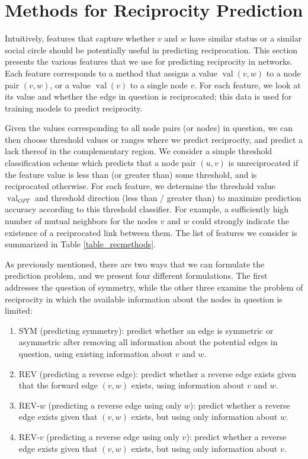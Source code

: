 \documentclass[conference]{IEEEtran}
\begin{document}
\section{Methods for Reciprocity Prediction}
Intuitively, features that capture whether $v$ and $w$ have similar status or a similar social circle should be potentially useful in predicting reciprocation. 
This section presents the various features that we use for predicting reciprocity in networks. 
Each feature corresponds to a method that assigns a value $\operatorname{val}(v,w)$ to a node pair $(v,w)$, or a value $\operatorname{val}(v)$ to a single node $v$. 
For each feature, we look at its value and whether the edge in question is reciprocated; this data is used for training models to predict reciprocity.

Given the values corresponding to all node pairs (or nodes) in question, we can then choose threshold values or ranges where we predict reciprocity, 
and predict a lack thereof in the complementary region.
We consider a simple threshold classification scheme which predicts that a node pair $(u,v)$ is unreciprocated if the feature value is less than (or greater than) some threshold, and is reciprocated otherwise.
For each feature, we determine the threshold value $\operatorname{val}_{OPT}$ and threshold direction (less than / greater than) to maximize prediction accuracy according to this threshold classifier.
For example, a sufficiently high number of mutual neighbors 
for the nodes $v$ and $w$ could strongly indicate the existence of a reciprocated link between them.
The list of features we consider is summarized in Table \ref{table_recmethods}.

As previously mentioned, there are two ways that we can formulate the prediction problem, and we present four different formulations. 
The first addresses the question of symmetry, while the other three examine the problem of reciprocity in which the available information about the nodes in question is limited:

\begin{enumerate}
\item SYM (predicting symmetry): predict whether an edge is symmetric or asymmetric after removing all information about the potential edges in question, using existing information about $v$ and $w$.
\item REV (predicting a reverse edge): predict whether a reverse edge exists given that the forward edge $(v,w)$ exists, using information about $v$ and $w$.
\item REV-$w$ (predicting a reverse edge using only $w$): predict whether a reverse edge exists given that $(v,w)$ exists, but using only information about $w$.
\item REV-$v$ (predicting a reverse edge using only $v$): predict whether a reverse edge exists given that $(v,w)$ exists, but using only information about $v$.
\end{enumerate}
\end{document}
